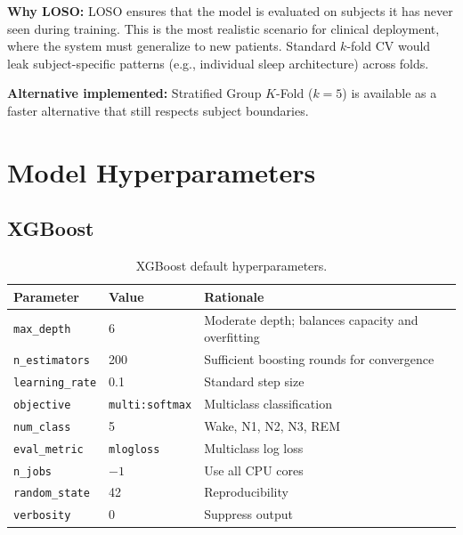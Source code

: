\textbf{Why LOSO:} LOSO ensures that the model is evaluated on subjects it has never seen during training. This is the most realistic scenario for clinical deployment, where the system must generalize to new patients. Standard $k$-fold CV would leak subject-specific patterns (e.g., individual sleep architecture) across folds.

\textbf{Alternative implemented:} Stratified Group $K$-Fold ($k=5$) is available as a faster alternative that still respects subject boundaries.

\section{Model Hyperparameters}
\label{sec:app_models}

\subsection{XGBoost}

\begin{table}[h]
\centering
\caption{XGBoost default hyperparameters.}
\label{tab:xgb_params}
\begin{tabular}{l l l}
\toprule
\textbf{Parameter} & \textbf{Value} & \textbf{Rationale} \\
\midrule
\texttt{max\_depth}       & 6                 & Moderate depth; balances capacity and overfitting \\
\texttt{n\_estimators}    & 200               & Sufficient boosting rounds for convergence \\
\texttt{learning\_rate}   & 0.1               & Standard step size \\
\texttt{objective}        & \texttt{multi:softmax} & Multiclass classification \\
\texttt{num\_class}       & 5                 & Wake, N1, N2, N3, REM \\
\texttt{eval\_metric}     & \texttt{mlogloss} & Multiclass log loss \\
\texttt{n\_jobs}          & $-1$              & Use all CPU cores \\
\texttt{random\_state}    & 42                & Reproducibility \\
\texttt{verbosity}        & 0                 & Suppress output \\
\bottomrule
\end{tabular}
\end{table}

